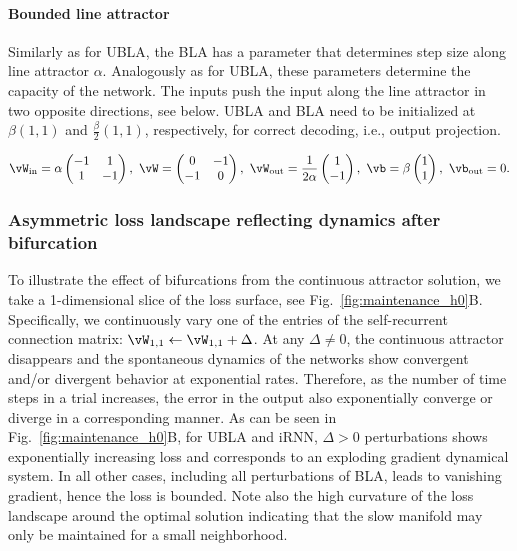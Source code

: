 \documentclass{article} %
\newcounter{ct}
\newcommand{\win}{\vW_{\text{in}}}
\newcommand{\wout}{\vW_{\text{out}}}
\newcommand{\bout}{\vb_{\text{out}}}
\theoremstyle{definition}
\theoremstyle{remark}
\begin{document}
\paragraph{Bounded line attractor}\label{sec:bla}
Similarly as for UBLA, the BLA has a parameter that determines step size along line attractor $\alpha$. Analogously as for UBLA, these parameters determine the capacity of the network.
The inputs push the input along the line attractor in two opposite directions, see below. UBLA and BLA need to be initialized at $\beta(1,1)$ and $\tfrac{\beta}{2}(1,1)$, respectively, for correct decoding, i.e., output projection.

\begin{equation}\label{eq:bla}
\win = \alpha
\begin{pmatrix}
-1  &  1 \\
1  &  -1
\end{pmatrix}, \
\vW = 
\begin{pmatrix}
0  &  -1 \\
-1  &  0
\end{pmatrix}, \
\wout = \frac{1}{2\alpha}
\begin{pmatrix}
1  \\  -1 
\end{pmatrix}, \
\vb = \beta
\begin{pmatrix}
1 \\  1 
\end{pmatrix}, \
\bout = 0.
\end{equation}

\subsubsection{Asymmetric loss landscape reflecting dynamics after bifurcation}\label{sec:asymmetricloss}
To illustrate the effect of bifurcations from the continuous attractor solution, we take a 1-dimensional slice of the loss surface, see Fig.~\ref{fig:maintenance_h0}B.
Specifically, we continuously vary one of the entries of the self-recurrent connection matrix: $    \vW_{1,1} \leftarrow \vW_{1,1} + \Delta$. %
At any $\Delta \neq 0$, the continuous attractor disappears and the spontaneous dynamics of the networks show convergent and/or divergent behavior at exponential rates.
Therefore, as the number of time steps in a trial increases, the error in the output also exponentially converge or diverge in a corresponding manner.
As can be seen in Fig.~\ref{fig:maintenance_h0}B, for UBLA and iRNN, $\Delta > 0$  perturbations shows exponentially increasing loss and corresponds to an exploding gradient dynamical system.
In all other cases, including all perturbations of BLA, leads to vanishing gradient, hence the loss is bounded.
Note also the high curvature of the loss landscape around the optimal solution indicating that the slow manifold may only be maintained for a small neighborhood.
\end{document}
